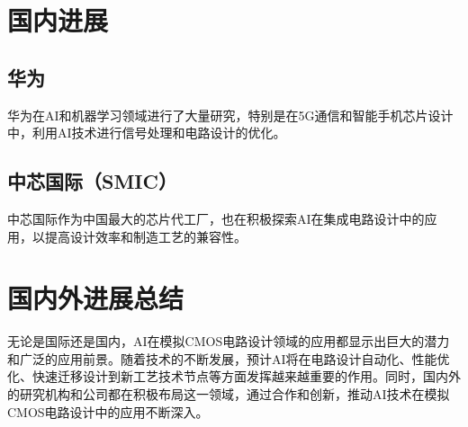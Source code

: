 

\section{国内进展}

\subsection{华为}

华为在AI和机器学习领域进行了大量研究，特别是在5G通信和智能手机芯片设计中，利用AI技术进行信号处理和电路设计的优化。

\subsection{中芯国际（SMIC）}

中芯国际作为中国最大的芯片代工厂，也在积极探索AI在集成电路设计中的应用，以提高设计效率和制造工艺的兼容性。

\section{国内外进展总结}

无论是国际还是国内，AI在模拟CMOS电路设计领域的应用都显示出巨大的潜力和广泛的应用前景。随着技术的不断发展，预计AI将在电路设计自动化、性能优化、快速迁移设计到新工艺技术节点等方面发挥越来越重要的作用。同时，国内外的研究机构和公司都在积极布局这一领域，通过合作和创新，推动AI技术在模拟CMOS电路设计中的应用不断深入。

